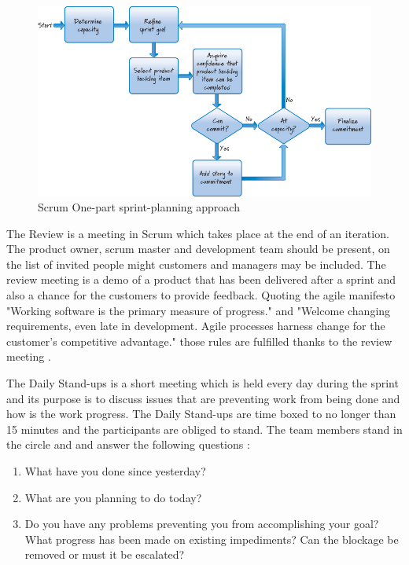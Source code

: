 \begin{figure}[h]
\caption{Scrum One-part sprint-planning approach \cite{ScrumBook}}
\label{fig:planningDiagram}
\centering
\includegraphics[width=1\textwidth]{img/sprintPlanning}
\end{figure}

The Review is a meeting in Scrum which takes place at the end of an iteration. The product owner, scrum master and development team should be present, on the list of invited people might customers and managers may be included. The review meeting is a demo of a product that has been delivered after a sprint and also a chance for the customers to provide feedback. Quoting the agile manifesto "Working software is the primary measure of progress." and "Welcome changing requirements, even late in development. Agile processes harness change for the customer's competitive advantage." those rules are fulfilled thanks to the review meeting \cite{DotNetScrumBook}.

The Daily Stand-ups is a short meeting which is held every day during the sprint and its purpose is to discuss issues that are preventing work from being done and how is the work progress. The Daily Stand-ups are time boxed to no longer than 15 minutes and the participants are obliged to stand. The team members stand in the circle and and answer the following questions \cite{DotNetScrumBook}:
\begin{enumerate}
    \item What have you done since yesterday?
    \item What are you planning to do today?
    \item Do you have any problems preventing you from accomplishing your goal? What progress has been made on existing impediments? Can the blockage be removed or must it be escalated?
\end{enumerate}

